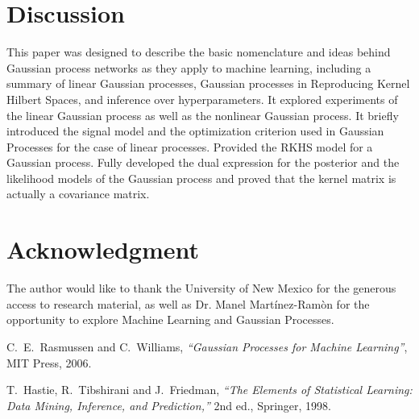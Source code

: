\documentclass[journal]{IEEEtran}
\begin{document}
\section{Discussion}

This paper was designed to describe the basic nomenclature and ideas behind Gaussian process networks as they apply to machine learning, including a summary of linear Gaussian processes, Gaussian processes in Reproducing Kernel Hilbert Spaces, and inference over hyperparameters. It explored  experiments of the linear Gaussian process as well as the nonlinear Gaussian process. It briefly introduced the signal model and the optimization criterion used in Gaussian Processes for the case of linear processes. Provided the RKHS model for a Gaussian process. Fully developed the dual expression for the posterior and the likelihood models of the Gaussian process and proved that the kernel matrix is actually a covariance matrix.

\section*{Acknowledgment}
The author would like to thank the University of New Mexico for the generous access to research material, as well as Dr. Manel Martínez-Ramòn for the opportunity to explore Machine Learning and Gaussian Processes.

\begin{thebibliography}{6}

C.~E.~Rasmussen and C.~Williams, \textit{\enquote{Gaussian Processes for Machine Learning}}, MIT Press, 2006.

T.~Hastie, R.~Tibshirani and J.~Friedman, \textit{\enquote{The Elements of Statistical Learning: Data Mining, Inference, and Prediction,}} 2nd ed., Springer, 1998.

\end{thebibliography}
\end{document}
